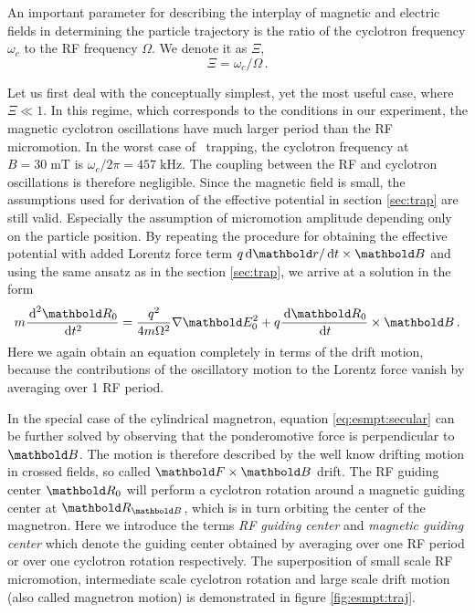 An important parameter for describing the interplay of magnetic
and electric fields in determining the particle trajectory is
the ratio of the cyclotron frequency $\omega_c$ to the \ac{RF}
frequency $\Omega$. We denote it as $\Xi$,
\begin{equation}
\Xi = \omega_c/\Omega\,.
\end{equation}

Let us first deal with the conceptually simplest, yet the most
useful case, where $\Xi \ll 1$. In this regime, which corresponds
to the conditions in our experiment, the magnetic
cyclotron oscillations have much larger period than the \ac{RF}
micromotion. In the worst case of \Hminus\ trapping,
the cyclotron frequency at $B=30\;\text{mT}$ is
$\omega_c/2\pi=457\;\text{kHz}$. The coupling between the \ac{RF}
 and cyclotron oscillations is therefore negligible. Since the
magnetic field is small, the assumptions used for derivation
of the effective potential in section \ref{sec:trap} are still
valid. Especially the assumption of micromotion amplitude
depending only on the particle position. By repeating the procedure
for obtaining the effective potential with added Lorentz
force term $q\de\mb r/\de t\times \mb B$ and using the same
ansatz as in the section \ref{sec:trap}, we arrive
at a solution in the form
\begin{equation}
m\frac{\de^2\mb R_0}{\de t^2} =
\frac{q^2}{4m\Omega^2}\nabla\mb E_0^2 +
q\frac{\de \mb R_0}{\de t}\times \mb B\,.
\label{eq:esmpt:secular}
\end{equation}
Here we again obtain an equation completely in terms of the
drift motion, because the contributions of the oscillatory
motion to the Lorentz force vanish by averaging over 1 \ac{RF}
period.

In the special case of the cylindrical magnetron, equation
\eqref{eq:esmpt:secular} can be further solved by observing
that the ponderomotive force is perpendicular to $\mb B$.
The motion is therefore described by the well know drifting
motion in crossed fields, so called $\mb F\times\mb B$ drift.
The \ac{RF} guiding center $\mb R_0$
will perform a cyclotron rotation around a magnetic guiding
center at $\mb R_{\mb B}$, which is in turn orbiting the center
of the magnetron. Here we introduce the terms {\em RF
guiding center} and {\em magnetic guiding center} which
denote the guiding center obtained by averaging over one \ac{RF}
period or over one cyclotron rotation respectively.
The superposition of small scale \ac{RF} micromotion,
intermediate scale cyclotron rotation and large scale drift
motion (also called magnetron motion) is demonstrated in figure
\ref{fig:esmpt:traj}.

